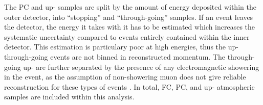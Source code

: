 The PC and up-\quickmath{\mu} samples are split by the amount of energy deposited within the outer detector, into ``stopping'' and ``through-going'' samples. If an event leaves the detector, the energy it takes with it has to be estimated which increases the systematic uncertainty compared to events entirely contained within the inner detector. This estimation is particulary poor at high energies, thus the up-\quickmath{\mu} through-going events are not binned in reconstructed momentum. The through-going up-\quickmath{\mu} are further separated by the presence of any electromagnetic showering in the event, as the assumption of non-showering muon does not give reliable reconstruction for these types of events \cite{Ashie_2005}. In total,  FC,  PC, and  up-\quickmath{\mu} atmospheric samples are included within this analysis.

